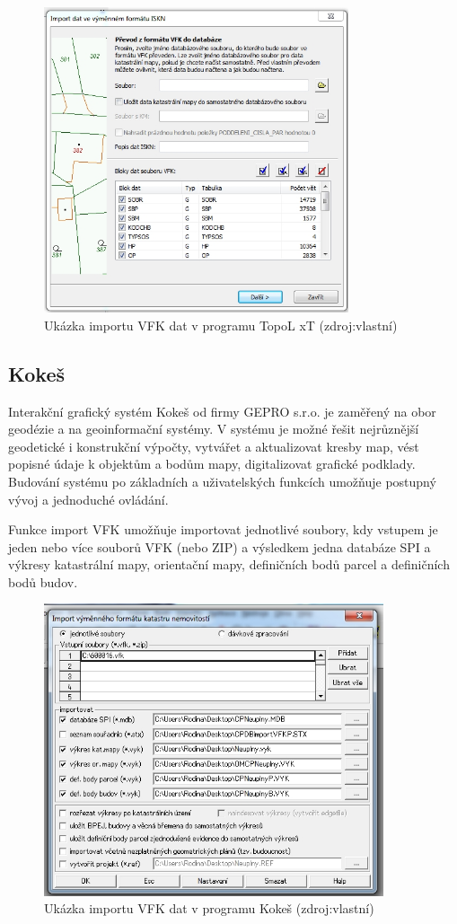 \begin{figure}[H]
	 \centering
      \includegraphics[height=9cm]{./pictures/topol.png}
      \caption{Ukázka importu VFK dat v programu TopoL xT (zdroj:vlastní)}
      \label{fig:topol}
  \end{figure}
\subsection{Kokeš}
Interakční grafický systém Kokeš od firmy GEPRO s.r.o. je zaměřený na obor geodézie a na geoinformační systémy. V systému je možné řešit nejrůznější geodetické i konstrukční výpočty, vytvářet a aktualizovat kresby map, vést popisné údaje k objektům a bodům mapy, digitalizovat grafické podklady. Budování systému po základních a uživatelských funkcích umožňuje postupný vývoj a jednoduché ovládání. \cite{kokes_cvut}

Funkce import VFK umožňuje importovat jednotlivé soubory, kdy vstupem je jeden nebo více souborů VFK (nebo ZIP) a výsledkem jedna databáze SPI a výkresy katastrální mapy, orientační mapy, definičních bodů parcel a definičních bodů budov. %

\begin{figure}[H]
	 \centering
      \includegraphics[width=10cm]{./pictures/kokes.png}
      \caption{Ukázka importu VFK dat v programu Kokeš (zdroj:vlastní)}
      \label{fig:kokes}
  \end{figure}
